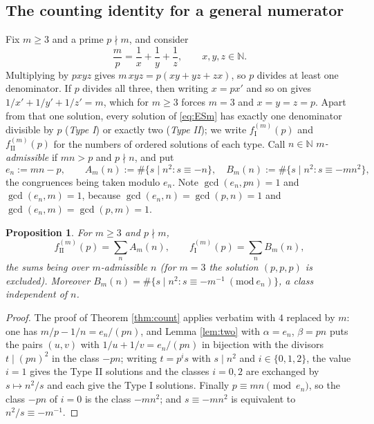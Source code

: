 \documentclass[11pt,reqno]{amsart}
\theoremstyle{plain}
\newtheorem{proposition}[theorem]{Proposition}
\theoremstyle{definition}
\numberwithin{equation}{section}
\newcommand{\N}{\mathbb{N}}
\newcommand{\fI}{f_{\mathrm{I}}}
\newcommand{\fII}{f_{\mathrm{II}}}
\begin{document}
\subsection{The counting identity for a general numerator}
Fix $m\ge3$ and a prime $p\nmid m$, and consider
\begin{equation}\label{eq:ESm}
  \frac mp=\frac1x+\frac1y+\frac1z,\qquad x,y,z\in\N .
\end{equation}
Multiplying by $pxyz$ gives $m\,xyz=p(xy+yz+zx)$, so $p$ divides at least one
denominator. If $p$ divides all three, then writing $x=px'$ and so on gives
$1/x'+1/y'+1/z'=m$, which for $m\ge3$ forces $m=3$ and $x=y=z=p$. Apart from that one
solution, every solution of \eqref{eq:ESm} has exactly one denominator divisible by
$p$ (\emph{Type I}) or exactly two (\emph{Type II}); we write $\fI^{(m)}(p)$ and
$\fII^{(m)}(p)$ for the numbers of ordered solutions of each type. Call $n\in\N$
\emph{$m$-admissible} if $mn>p$ and $p\nmid n$, and put
\begin{equation}\label{eq:enm}
  e_{n}:=mn-p,\qquad
  A_{m}(n):=\#\{s\mid n^{2}: s\equiv-n\},\quad
  B_{m}(n):=\#\{s\mid n^{2}: s\equiv-mn^{2}\},
\end{equation}
the congruences being taken modulo $e_{n}$. Note $\gcd(e_{n},pn)=1$ and $\gcd(e_{n},m)=1$,
because $\gcd(e_{n},n)=\gcd(p,n)=1$ and $\gcd(e_{n},m)=\gcd(p,m)=1$.

\begin{proposition}\label{prop:countm}
For $m\ge3$ and $p\nmid m$,
\[
  \fII^{(m)}(p)=\sum_{n}A_{m}(n),\qquad \fI^{(m)}(p)=\sum_{n}B_{m}(n),
\]
the sums being over $m$-admissible $n$ (for $m=3$ the solution $(p,p,p)$ is excluded).
Moreover $B_{m}(n)=\#\{s\mid n^{2}:s\equiv-m^{-1}\ (\mathrm{mod}\ e_{n})\}$, a class
independent of $n$.
\end{proposition}

\begin{proof}
The proof of Theorem \ref{thm:count} applies verbatim with $4$ replaced by $m$: one
has $m/p-1/n=e_{n}/(pn)$, and Lemma \ref{lem:two} with $\alpha=e_{n}$, $\beta=pn$
puts the pairs $(u,v)$ with $1/u+1/v=e_{n}/(pn)$ in bijection with the divisors
$t\mid(pn)^{2}$ in the class $-pn$; writing $t=p^{i}s$ with $s\mid n^{2}$ and
$i\in\{0,1,2\}$, the value $i=1$ gives the Type II solutions and the classes $i=0,2$
are exchanged by $s\mapsto n^{2}/s$ and each give the Type I solutions. Finally
$p\equiv mn\pmod{e_{n}}$, so the class $-pn$ of $i=0$ is the class $-mn^{2}$; and
$s\equiv-mn^{2}$ is equivalent to $n^{2}/s\equiv-m^{-1}$.
\end{proof}
\end{document}
